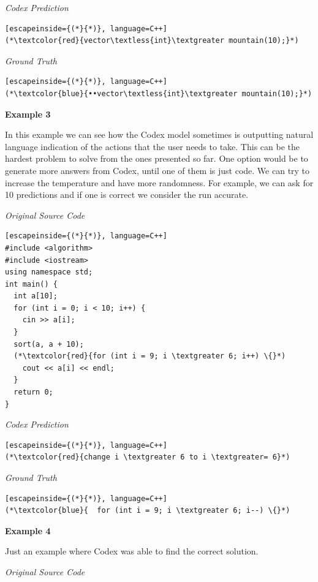 \documentclass[12pt,a4paper]{report}
\begin{document}
\begin{appendices}
\textit{Codex Prediction}

\begin{lstlisting}[escapeinside={(*}{*)}, language=C++]
(*\textcolor{red}{vector\textless{int}\textgreater mountain(10);}*)
\end{lstlisting}

\textit{Ground Truth}

\begin{lstlisting}[escapeinside={(*}{*)}, language=C++]
(*\textcolor{blue}{••vector\textless{int}\textgreater mountain(10);}*)
\end{lstlisting}

\textbf{Example 3}

In this example we can see how the Codex model sometimes is outputting natural language indication of the actions that the user needs to take. This can be the hardest problem to solve from the ones presented so far. One option would be to generate more answers from Codex, until one of them is just code. We can try to increase the temperature and have more randomness. For example, we can ask for 10 predictions and if one is correct we consider the run accurate.

\textit{Original Source Code}

\begin{lstlisting}[escapeinside={(*}{*)}, language=C++]
#include <algorithm> 
#include <iostream> 
using namespace std; 
int main() { 
  int a[10]; 
  for (int i = 0; i < 10; i++) { 
    cin >> a[i]; 
  } 
  sort(a, a + 10); 
  (*\textcolor{red}{for (int i = 9; i \textgreater 6; i++) \{}*)
    cout << a[i] << endl; 
  } 
  return 0; 
}
\end{lstlisting}

\textit{Codex Prediction}

\begin{lstlisting}[escapeinside={(*}{*)}, language=C++]
(*\textcolor{red}{change i \textgreater 6 to i \textgreater= 6}*)
\end{lstlisting}

\textit{Ground Truth}

\begin{lstlisting}[escapeinside={(*}{*)}, language=C++]
(*\textcolor{blue}{  for (int i = 9; i \textgreater 6; i--) \{}*)
\end{lstlisting}

\textbf{Example 4}

Just an example where Codex was able to find the correct solution.

\textit{Original Source Code}


\end{appendices}
\end{document}
